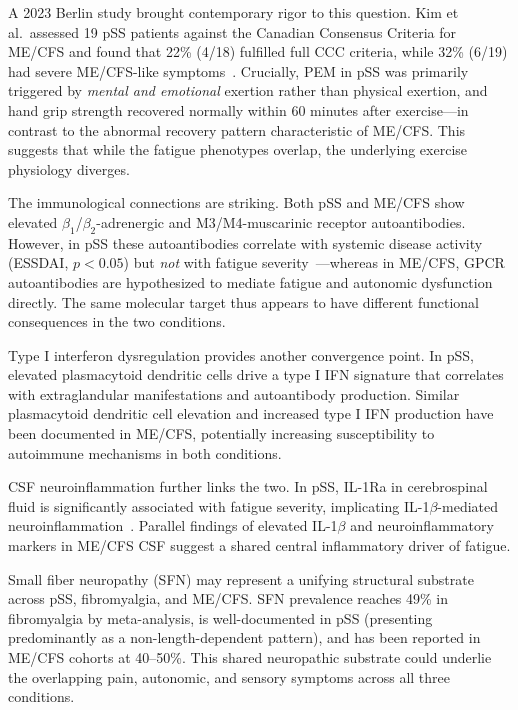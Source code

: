A 2023 Berlin study brought contemporary rigor to this question. Kim et al.\ assessed 19 pSS patients against the Canadian Consensus Criteria for ME/CFS and found that 22\% (4/18) fulfilled full CCC criteria, while 32\% (6/19) had severe ME/CFS-like symptoms~\cite{Kim2023SjogrenMECFS}. Crucially, PEM in pSS was primarily triggered by \textit{mental and emotional} exertion rather than physical exertion, and hand grip strength recovered normally within 60 minutes after exercise---in contrast to the abnormal recovery pattern characteristic of ME/CFS. This suggests that while the fatigue phenotypes overlap, the underlying exercise physiology diverges.

The immunological connections are striking. Both pSS and ME/CFS show elevated $\beta_1$/$\beta_2$-adrenergic and M3/M4-muscarinic receptor autoantibodies. However, in pSS these autoantibodies correlate with systemic disease activity (ESSDAI, $p<0.05$) but \textit{not} with fatigue severity~\cite{Kim2023SjogrenMECFS}---whereas in ME/CFS, GPCR autoantibodies are hypothesized to mediate fatigue and autonomic dysfunction directly. The same molecular target thus appears to have different functional consequences in the two conditions.

Type I interferon dysregulation provides another convergence point. In pSS, elevated plasmacytoid dendritic cells drive a type I IFN signature that correlates with extraglandular manifestations and autoantibody production. Similar plasmacytoid dendritic cell elevation and increased type I IFN production have been documented in ME/CFS, potentially increasing susceptibility to autoimmune mechanisms in both conditions.

CSF neuroinflammation further links the two. In pSS, IL-1Ra in cerebrospinal fluid is significantly associated with fatigue severity, implicating IL-1$\beta$-mediated neuroinflammation~\cite{Omdal2019CSFfatigueSjogren}. Parallel findings of elevated IL-1$\beta$ and neuroinflammatory markers in ME/CFS CSF suggest a shared central inflammatory driver of fatigue.

Small fiber neuropathy (SFN) may represent a unifying structural substrate across pSS, fibromyalgia, and ME/CFS. SFN prevalence reaches 49\% in fibromyalgia by meta-analysis, is well-documented in pSS (presenting predominantly as a non-length-dependent pattern), and has been reported in ME/CFS cohorts at 40--50\%. This shared neuropathic substrate could underlie the overlapping pain, autonomic, and sensory symptoms across all three conditions.

